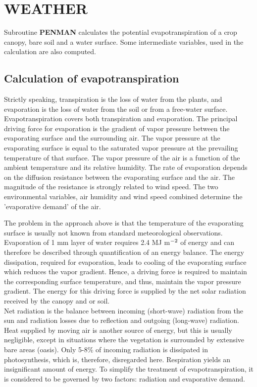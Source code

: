 \chapter{WEATHER}

Subroutine {\bf PENMAN} calculates the potential evapotranspiration of a crop canopy, bare
soil and a water surface. Some intermediate variables, used in the calculation are also
computed.

\section{Calculation of evapotranspiration}

Strictly speaking, transpiration is the loss of water from the plants, and evaporation is the
loss of water from the soil or from a free-water surface. Evapotranspiration covers both
transpiration and evaporation.
The principal driving force for evaporation is the gradient of vapor pressure between the
evaporating surface and the surrounding air. The vapor pressure at the evaporating
surface is equal to the saturated vapor pressure at the prevailing temperature of that
surface. The vapor pressure of the air is a function of the ambient temperature and its
relative humidity. The rate of evaporation depends on the diffusion resistance between the
evaporating surface and the air.
The magnitude of the resistance is strongly related to wind speed. The two environ\-mental
variables, air humidity and wind speed combined determine the 'evaporative demand' of
the air.

The problem in the approach above is that the temperature of the evaporating surface is
usually not known from standard meteorological observations. Evaporation  of 1 mm
layer of water requires 2.4 MJ m$^{{\rm -2}}$ of energy and can therefore be described through
quantification of an energy balance. The energy dissipation, required for evaporation,
leads to cooling of the evaporating surface which reduces the vapor gradient. Hence, a
driving force is required to maintain the corresponding surface temperature, and thus,
maintain the vapor pres\-sure gradient. The energy for this driving force is supplied by the
net solar radiation received by the canopy and or soil.\\
Net radiation is the balance between incoming (short-wave) radiation from the sun and
radiation losses due to reflection and outgoing (long-wave) radiation. Heat supplied by
moving air is another source of energy, but this is usually negligible, except in situations
where the vegetation is surrounded by extensive bare areas (oasis). Only 5-8\% of
incoming radiation is dissipated in photosynthesis, which is, therefore, disregarded here.
Respiration yields an insignificant amount of energy. To simplify the treatment of
evapotranspiration, it is considered to be governed by two factors: radiation and evaporative demand.

